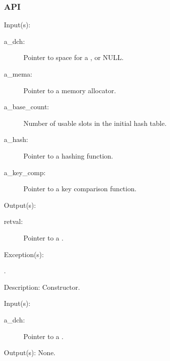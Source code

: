\subsubsection{API}
\begin{capi}

\label{dch_new}
	\begin{capilist}
	\item[Input(s): ]
		\begin{description}\item[]
		\item[a\_dch: ]
			Pointer to space for a , or NULL.
		\item[a\_mema: ]
			Pointer to a memory allocator.
		\item[a\_base\_count: ]
			Number of usable slots in the initial hash table.
		\item[a\_hash: ]
			Pointer to a hashing function.
		\item[a\_key\_comp: ]
			Pointer to a key comparison function.
		\end{description}
	\item[Output(s): ]
		\begin{description}\item[]
		\item[retval: ]
			Pointer to a .
		\end{description}
	\item[Exception(s): ]
		\begin{description}\item[]
		\item[.]
		\end{description}
	\item[Description: ]
		Constructor.
	\end{capilist}
\label{dch_delete}
	\begin{capilist}
	\item[Input(s): ]
		\begin{description}\item[]
		\item[a\_dch: ]
			Pointer to a \classname{dch}.
		\end{description}
	\item[Output(s): ] None.

\end{capilist}
\end{capi}
